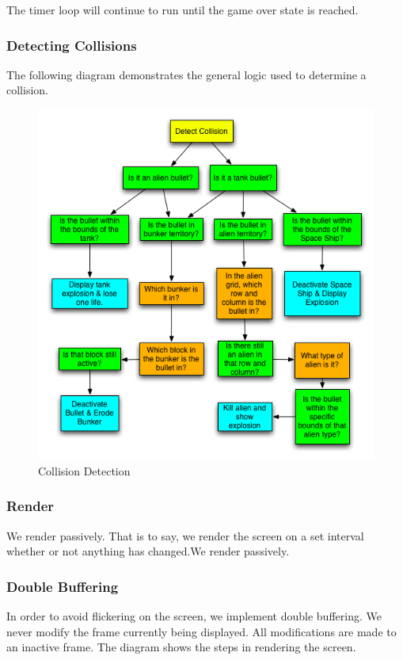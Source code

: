 \documentclass[11pt,letter,oneside]{report}
\begin{document}
The timer loop will continue to run until the game over state is reached.

\subsubsection{Detecting Collisions}
The following diagram demonstrates the general logic used to determine a collision.
\begin{figure}
\centering
\includegraphics[scale=.5]{Detect_Collision.jpg}
\caption{Collision Detection}
\end{figure}

\subsubsection{Render}
We render passively.  That is to say, we render the screen on a set interval whether or not anything has changed.We render passively.

\subsubsection{Double Buffering}
In order to avoid flickering on the screen, we implement double buffering.  We never modify the frame currently being displayed.  All modifications are made to an inactive frame.  The diagram shows the steps in rendering the screen.
\end{document}
